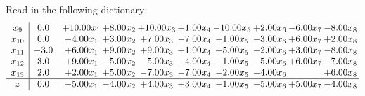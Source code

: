\documentclass[9pt]{article}
\begin{document}
Read in the following dictionary:
\[\begin{array}{c| c c@{\hskip 2pt} c@{\hskip 2pt} c@{\hskip 2pt} c@{\hskip 2pt} c@{\hskip 2pt} c@{\hskip 2pt} c@{\hskip 2pt} c@{\hskip 2pt} }
 x_{9}   &  0.0 & + 10.00 x_{1} & +  8.00 x_{2} & + 10.00 x_{3} & +  1.00 x_{4} & -10.00 x_{5} & +  2.00 x_{6} & -6.00 x_{7} & -8.00 x_{8}\\
 x_{10}   &  0.0 & -4.00 x_{1} & +  3.00 x_{2} & +  7.00 x_{3} & -7.00 x_{4} & -1.00 x_{5} & -3.00 x_{6} & +  6.00 x_{7} & +  2.00 x_{8}\\
 x_{11}   &  -3.0 & +  6.00 x_{1} & +  9.00 x_{2} & +  9.00 x_{3} & +  1.00 x_{4} & +  5.00 x_{5} & -2.00 x_{6} & +  3.00 x_{7} & -8.00 x_{8}\\
 x_{12}   &  3.0 & +  9.00 x_{1} & -5.00 x_{2} & -5.00 x_{3} & -4.00 x_{4} & -1.00 x_{5} & -5.00 x_{6} & +  6.00 x_{7} & -7.00 x_{8}\\
 x_{13}   &  2.0 & +  2.00 x_{1} & +  5.00 x_{2} & -7.00 x_{3} & -7.00 x_{4} & -2.00 x_{5} & -4.00 x_{6} &   & +  6.00 x_{8}\\
\hline
z    &  0.0 & -5.00 x_{1} & -4.00 x_{2} & +  4.00 x_{3} & +  3.00 x_{4} & -1.00 x_{5} & -5.00 x_{6} & +  5.00 x_{7} & -4.00 x_{8}\\
\end{array}\]
\end{document}
